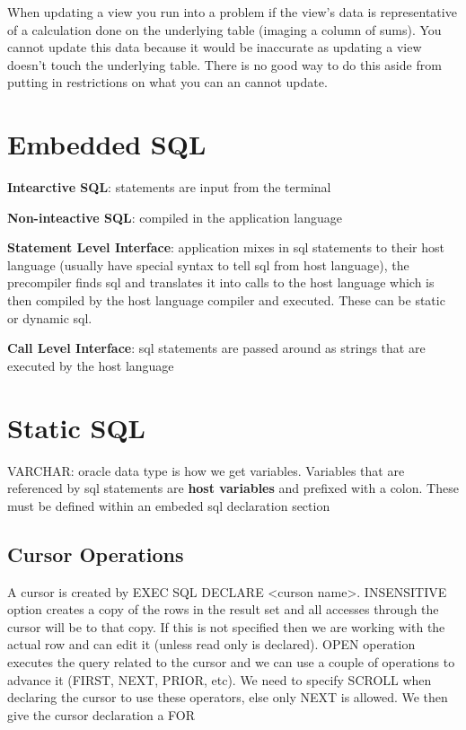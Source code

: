 \documentclass{article}
\begin{document}
When updating a view you run into a problem if the view's data is representative of a calculation done on the underlying table (imaging a column of sums). You cannot update this data because it would be inaccurate as updating a view doesn't touch the underlying table. There is no good way to do this aside from putting in restrictions on what you can an cannot update.
\section{Embedded SQL} %
\label{sec:sql_basics}
\textbf{Intearctive SQL}: statements are input from the terminal

\textbf{Non-inteactive SQL}: compiled in the application language

\textbf{Statement Level Interface}: application mixes in sql statements to their host language (usually have special syntax to tell sql from host language), the precompiler finds sql and translates it into calls to the host language which is then compiled by the host language compiler and executed. These can be static or dynamic sql.

\textbf{Call Level Interface}: sql statements are passed around as strings that are executed by the host language

\section{Static SQL} %
\label{sec:static_sql}
VARCHAR: oracle data type is how we get variables. Variables that are referenced by sql statements are \textbf{host variables} and prefixed with a colon. These must be defined within an embeded sql declaration section

\subsection*{Cursor Operations} %
\label{sec:cursor_operations}
A cursor is created by EXEC SQL DECLARE <curson name>. INSENSITIVE option creates a copy of the rows in the result set and all accesses through the cursor will be to that copy. If this is not specified then we are working with the actual row and can edit it (unless read only is declared). OPEN operation executes the query related to the cursor and we can use a couple of operations to advance it (FIRST, NEXT, PRIOR, etc). We need to specify SCROLL when declaring the cursor to use these operators, else only NEXT is allowed. We then give the cursor declaration a FOR
\end{document}
